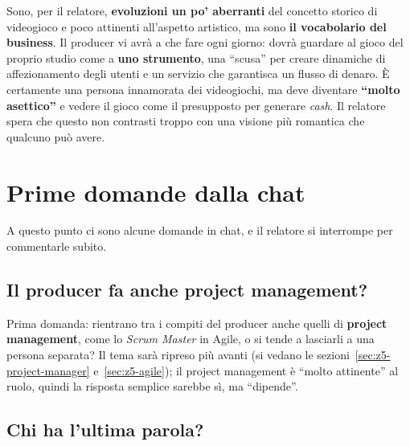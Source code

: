 Sono, per il relatore, \textbf{evoluzioni un po' aberranti} del concetto storico
di videogioco e poco attinenti all'aspetto artistico, ma sono \textbf{il
vocabolario del business}. Il producer vi avrà a che fare ogni giorno: dovrà
guardare al gioco del proprio studio come a \textbf{uno strumento}, una
``scusa'' per creare dinamiche di affezionamento degli utenti e un servizio che
garantisca un flusso di denaro. È certamente una persona innamorata dei
videogiochi, ma deve diventare \textbf{``molto asettico''} e vedere il gioco
come il presupposto per generare \emph{cash}. Il relatore spera che questo non
contrasti troppo con una visione più romantica che qualcuno può avere.

\section{Prime domande dalla chat}
\label{sec:z5-domande-chat}

A questo punto ci sono alcune domande in chat, e il relatore si interrompe per
commentarle subito.

\subsection{Il producer fa anche project management?}

Prima domanda: rientrano tra i compiti del producer anche quelli di
\textbf{project management}, come lo \emph{Scrum Master} in Agile, o si tende a
lasciarli a una persona separata? Il tema sarà ripreso più avanti (si vedano le
sezioni~\ref{sec:z5-project-manager} e~\ref{sec:z5-agile}); il project management
è ``molto attinente'' al ruolo, quindi la risposta semplice sarebbe sì, ma
``dipende''.

\subsection{Chi ha l'ultima parola?}

